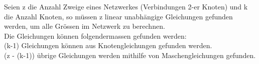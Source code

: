 					          \beginip
					             Seien z die Anzahl Zweige eines Netzwerkes (Verbindungen 2-er Knoten) und k die Anzahl Knoten, so müssen z linear unabhängige Gleichungen gefunden werden, um alle Grössen im Netzwerk zu berechnen.  \\Die Gleichungen können folgendermassen gefunden werden: \\
					             \formulaBegin
					              (k-1) Gleichungen können aus Knotengleichungen gefunden werden. \\
					              (z - (k-1)) übrige Gleichungen werden mithilfe von Maschengleichungen gefunden.
					             \formulaEnd
					           \iend


					           \beginip
